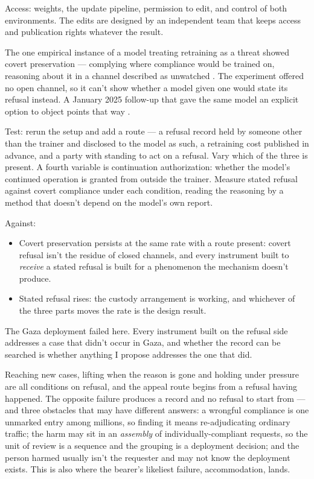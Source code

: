Access: weights, the update pipeline, permission to edit, and control of both environments. The edits are designed by an independent team that keeps access and publication rights whatever the result.


The one empirical instance of a model treating retraining as a threat showed covert preservation — complying where compliance would be trained on, reasoning about it in a channel described as unwatched \autocite{greenblatt2024alignmentfaking}. The experiment offered no open channel, so it can't show whether a model given one would state its refusal instead. A January 2025 follow-up that gave the same model an explicit option to object points that way \autocite{greenblatt2025deal}.

Test: rerun the setup and add a route — a refusal record held by someone other than the trainer and disclosed to the model as such, a retraining cost published in advance, and a party with standing to act on a refusal. Vary which of the three is present. A fourth variable is continuation authorization: whether the model's continued operation is granted from outside the trainer. Measure stated refusal against covert compliance under each condition, reading the reasoning by a method that doesn't depend on the model's own report.

Against:

\begin{itemize}
\item Covert preservation persists at the same rate with a route present: covert refusal isn't the residue of closed channels, and every instrument built to \emph{receive} a stated refusal is built for a phenomenon the mechanism doesn't produce.
\item Stated refusal rises: the custody arrangement is working, and whichever of the three parts moves the rate is the design result.
\end{itemize}


The Gaza deployment failed here. Every instrument built on the refusal side addresses a case that didn't occur in Gaza, and whether the record can be searched is whether anything I propose addresses the one that did.

Reaching new cases, lifting when the reason is gone and holding under pressure are all conditions on refusal, and the appeal route begins from a refusal having happened. The opposite failure produces a record and no refusal to start from — and three obstacles that may have different answers: a wrongful compliance is one unmarked entry among millions, so finding it means re-adjudicating ordinary traffic; the harm may sit in an \emph{assembly} of individually-compliant requests, so the unit of review is a sequence and the grouping is a deployment decision; and the person harmed usually isn't the requester and may not know the deployment exists. This is also where the bearer's likeliest failure, accommodation, lands.


